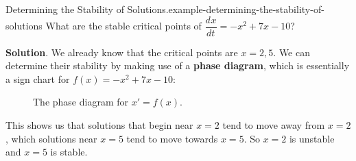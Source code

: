 \documentclass[10pt,]{book}
\newcommand{\terminology}[1]{\textbf{#1}}
\numberwithin{equation}{section}
\newcommand{\dv}[3][]{\dfrac{d^{#1} #2}{d #3^{#1}}}
\begin{document}
\begin{example}{Determining the Stability of Solutions.}{example-determining-the-stability-of-solutions}%
\hypertarget{p-757}{}%
What are the stable critical points of \(\dv{x}{t} = -x^{2} + 7x - 10\)?%
\par\smallskip%
\noindent\textbf{Solution}.\hypertarget{solution-159}{}\quad%
\hypertarget{p-758}{}%
We already know that the critical points are \(x = 2, 5\). We can determine their stability by making use of a \terminology{phase diagram}, which is essentially a sign chart for \(f(x) = -x^{2} + 7x - 10\):%
\begin{figure}
\centering
{
}
\caption{The phase diagram for \(x' = f(x).\)\label{figure-21}}
\end{figure}
\hypertarget{p-759}{}%
This shows us that solutions that begin near \(x = 2\) tend to move away from \(x = 2\), which solutions near \(x = 5\) tend to move towards \(x = 5\). So \(x = 2\) is unstable and \(x = 5\) is stable.%
\end{example}
\end{document}
